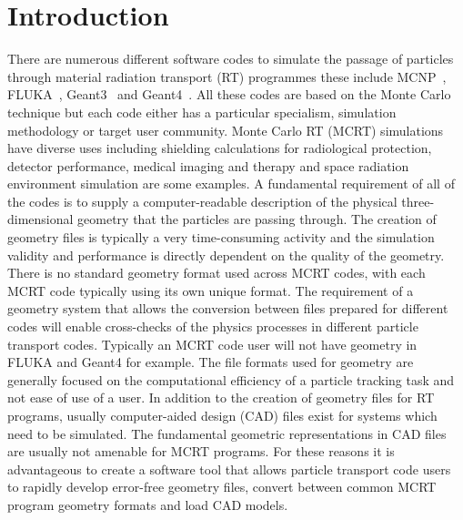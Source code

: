 \documentclass[final,5p,times,twocolumn]{elsarticle}
\begin{document}
\begin{small}

\end{small}

\section{Introduction} \label{sec:introduction}
There are numerous different software codes to simulate the passage of particles through material radiation transport (RT) programmes these 
include MCNP~\cite{Mcnp_Werner}, FLUKA~\cite{Fluka_Ferrari,Fluka_Bohlen}, Geant3~\cite{Geant3_Brun} and Geant4~\cite{Geant4_Agostinelli}. 
All these codes are based on the Monte Carlo technique but each code either has a particular specialism, simulation methodology or target user community.  
 Monte Carlo RT (MCRT) simulations have diverse uses including shielding calculations for radiological protection, detector performance, medical 
imaging and therapy and space radiation environment  simulation are some examples. A fundamental requirement of all of the codes is to supply a 
computer-readable description of the  physical three-dimensional geometry that  the particles are passing through.  The creation of geometry files is 
typically a very time-consuming activity and the simulation validity and performance is directly dependent on the quality of the geometry. There is no 
standard geometry format used across MCRT codes, with each MCRT code typically using its own unique format. The requirement of a geometry system 
that allows the conversion between files prepared for different codes will enable cross-checks of the physics processes in different particle transport
 codes. Typically an MCRT code user will not have geometry in FLUKA and Geant4 for example. The file formats used for geometry are generally focused 
 on the computational efficiency of a particle tracking task and not ease of use of a user. In addition to the creation of geometry files for RT programs, usually 
 computer-aided design (CAD) files exist for systems which need to be simulated. The fundamental geometric representations in CAD files are usually not 
 amenable for MCRT programs.  For these reasons it is advantageous to create a software tool that allows particle transport code users to rapidly develop 
 error-free geometry files, convert between common MCRT program geometry formats and load CAD models.
\end{document}
